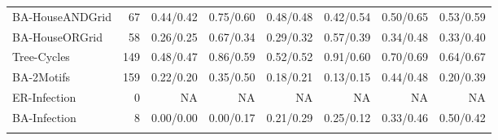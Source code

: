 {\begin{longtable}{@{}lr rrrrrr@{}}
BA-HouseANDGrid & 67 & 0.44/0.42 & 0.75/0.60 & 0.48/0.48 & 0.42/0.54 & 0.50/0.65 & 0.53/0.59 \\
BA-HouseORGrid & 58 & 0.26/0.25 & 0.67/0.34 & 0.29/0.32 & 0.57/0.39 & 0.34/0.48 & 0.33/0.40 \\
Tree-Cycles & 149 & 0.48/0.47 & 0.86/0.59 & 0.52/0.52 & 0.91/0.60 & 0.70/0.69 & 0.64/0.67 \\
BA-2Motifs & 159 & 0.22/0.20 & 0.35/0.50 & 0.18/0.21 & 0.13/0.15 & 0.44/0.48 & 0.20/0.39 \\
ER-Infection & 0 & NA & NA & NA & NA & NA & NA \\
BA-Infection & 8 & 0.00/0.00 & 0.00/0.17 & 0.21/0.29 & 0.25/0.12 & 0.33/0.46 & 0.50/0.42 \\
\addlinespace
\end{longtable}
}

